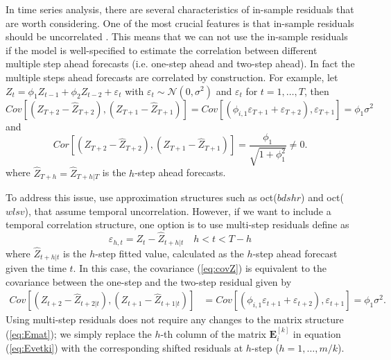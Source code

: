 \documentclass[a4paper,11pt]{article}
\newcommand{\Evet}{\bm{E}}
\theoremstyle{definition}
\begin{document}
In time series analysis, there are several characteristics of in-sample residuals that are worth considering. One of the most crucial features is that in-sample residuals should be uncorrelated \citep{tsay2014,hyndman2021}. %
This means that we can not use the in-sample residuals if the model is well-specified to estimate the correlation between different multiple step ahead forecasts (i.e. one-step ahead and two-step ahead). In fact the multiple steps ahead forecasts are correlated by construction. For example, let $Z_t = \phi_1 Z_{t-1} + \phi_2 Z_{t-2} + \varepsilon_t$ with $\varepsilon_t\sim \mathcal{N}(0, \sigma^2)$ and $\varepsilon_t$ for $t = 1,\dots,T$, then
\begin{equation}\label{eq:covZ}
	Cov\left[\left(Z_{T+2}-\widehat{Z}_{T+2}\right), \left(Z_{T+1}-\widehat{Z}_{T+1}\right)\right] = Cov\left[\left(\phi_{i, 1}\varepsilon_{T+1} + \varepsilon_{T+2}\right), \varepsilon_{T+1}\right] = \phi_{1}\sigma^2
\end{equation}
and
$$
Cor\left[\left(Z_{T+2}-\widehat{Z}_{T+2}\right), \left(Z_{T+1}-\widehat{Z}_{T+1}\right)\right] = \frac{\phi_{1}}{\sqrt{1+\phi_1^2}} \neq 0.
$$
where $\widehat{Z}_{T+h} = \widehat{Z}_{T+h|T}$ is the $h$-step ahead forecasts.

To address this issue, \cite{difonzo2023} use approximation structures such as oct($bdshr$) and oct($wlsv$), that assume temporal uncorrelation. However, if we want to include a temporal correlation structure, one option is to use multi-step residuals define as
$$
\varepsilon_{h,t} = Z_t - \widehat{Z}_{t+h|t}\quad h<t<T-h
$$
where $\widehat{Z}_{t+h|t}$ is the $h$-step fitted value, calculated as the $h$-step ahead forecast given the time $t$. In this case, the covariance (\ref{eq:covZ}) is equivalent to the covariance between the one-step and the two-step residual given by
\begin{equation*}
	\begin{aligned}
		Cov\left[\left(Z_{t+2}-\widehat{Z}_{t+2|t}\right), \left(Z_{t+1}-\widehat{Z}_{t+1|t}\right)\right] & = Cov\left[\left(\phi_{i, 1}\varepsilon_{t+1} + \varepsilon_{t+2}\right), \varepsilon_{t+1}\right] = \phi_{1}\sigma^2.
	\end{aligned}
\end{equation*}
Using multi-step residuals does not require any changes to the matrix structure (\ref{eq:Emat}); we simply replace the $h$-th column of the matrix $\Evet_i^{[k]}$ in equation (\ref{eq:Evetki}) with the corresponding shifted residuals at $h$-step ($h = 1, \dots, m/k$).
\end{document}
